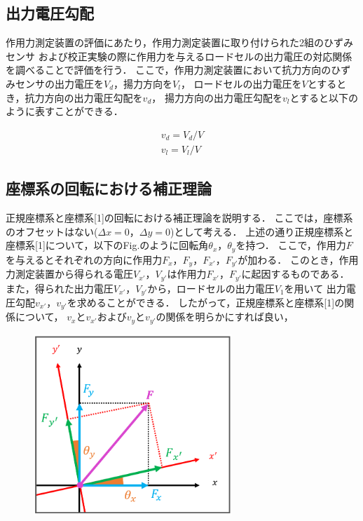 \newpage

\subsection{出力電圧勾配}

作用力測定装置の評価にあたり，作用力測定装置に取り付けられた2組のひずみセンサ
および校正実験の際に作用力を与えるロードセルの出力電圧の対応関係を調べることで評価を行う．
ここで，作用力測定装置において抗力方向のひずみセンサの出力電圧を$V_d$，揚力方向を$V_l$，
ロードセルの出力電圧を$V$とするとき，抗力方向の出力電圧勾配を$v_d$，
揚力方向の出力電圧勾配を$v_l$とすると以下のように表すことができる．

\begin{align}
    v_d = V_d / V \\
    v_l = V_l / V
\end{align}

\subsection{座標系の回転における補正理論}

正規座標系と座標系[1]の回転における補正理論を説明する．
ここでは，座標系のオフセットはない($\Delta x = 0$，$\Delta y = 0$)として考える．
上述の通り正規座標系と座標系[1]について，以下のFig.のように回転角$\theta_{x}$，$\theta_{y}$を持つ．
ここで，作用力$F$を与えるとそれぞれの方向に作用力$F_{x}$，$F_{y}$，$F_{x'}$，$F_{y'}$が加わる．
このとき，作用力測定装置から得られる電圧$V_{x'}$，$V_{y'}$は作用力$F_{x'}$，$F_{y'}$に起因するものである．
また，得られた出力電圧$V_{x'}$，$V_{y'}$から，ロードセルの出力電圧$V_1$を用いて
出力電圧勾配$v_{x'}$，$v_{y'}$を求めることができる．
したがって，正規座標系と座標系[1]の関係について，
$v_{x}$と$v_{x'}$および$v_{y}$と$v_{y'}$の関係を明らかにすれば良い，

\begin{figure}[htbp]
    \footnotesize
    \begin{center}
        \includegraphics[width=75mm]{images/33-1.png}
        \caption{}
    \end{center}
\end{figure}

